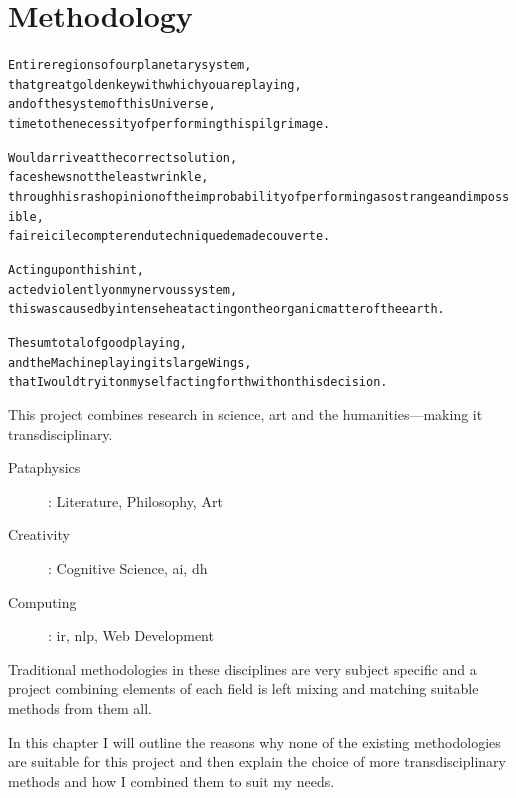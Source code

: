 
\chapter{Methodology}
\label{ch:methodology}

\startcontents[chapters]

\vfill

\begin{alltt}\sffamily
Entire regions of our planetary system,
that great golden key with which you are playing,
and of the system of this Universe,
time to the necessity of performing this pilgrimage.

Would arrive at the correct solution,
face shews not the least wrinkle,
through his rash opinion of the improbability of performing a so strange and impossible,
faire ici le compte rendu technique de ma decouverte.

Acting upon this hint,
acted violently on my nervous system,
this was caused by intense heat acting on the organic matter of the earth.

The sum total of good playing,
and the Machine playing its large Wings,
that I would try it on myself acting forthwith on this decision.
\end{alltt}

\newpage
\minicontents
\spirals


This project combines research in science, art and the humanities---making it transdisciplinary.

\begin{description}
  \item [Pataphysics]: Literature, Philosophy, Art
  \item [Creativity]: Cognitive Science, \gls{ai}, \gls{dh}
  \item [Computing]: \gls{ir}, \gls{nlp}, Web Development
\end{description}


Traditional methodologies in these disciplines are very subject specific and a project combining elements of each field is left mixing and matching suitable methods from them all.

In this chapter I will outline the reasons why none of the existing methodologies are suitable for this project and then explain the choice of more transdisciplinary methods and how I combined them to suit my needs.

